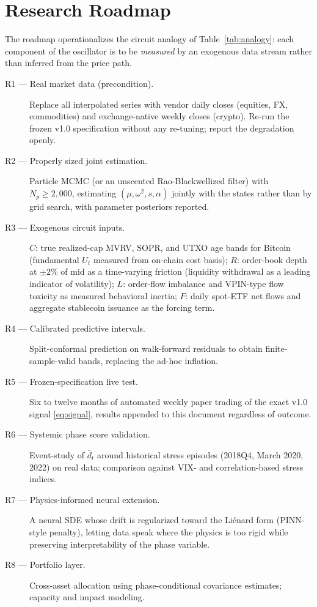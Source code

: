 \documentclass[11pt,a4paper]{article}
\begin{document}
\section{Research Roadmap}\label{sec:roadmap}

The roadmap operationalizes the circuit analogy of Table~\ref{tab:analogy}: each component of the oscillator is to be \emph{measured} by an exogenous data stream rather than inferred from the price path.

\begin{description}
\item[R1 --- Real market data (precondition).] Replace all interpolated series with vendor daily closes (equities, FX, commodities) and exchange-native weekly closes (crypto). Re-run the frozen v1.0 specification without any re-tuning; report the degradation openly.
\item[R2 --- Properly sized joint estimation.] Particle MCMC (or an unscented Rao-Blackwellized filter) with $N_p \ge 2{,}000$, estimating $(\mu, \omega^2, s, \alpha)$ jointly with the states rather than by grid search, with parameter posteriors reported.
\item[R3 --- Exogenous circuit inputs.]
$C$: true realized-cap MVRV, SOPR, and UTXO age bands for Bitcoin (fundamental $U_t$ measured from on-chain cost basis);
$R$: order-book depth at $\pm 2\%$ of mid as a time-varying friction (liquidity withdrawal as a leading indicator of volatility);
$L$: order-flow imbalance and VPIN-type flow toxicity as measured behavioral inertia;
$F$: daily spot-ETF net flows and aggregate stablecoin issuance as the forcing term.
\item[R4 --- Calibrated predictive intervals.] Split-conformal prediction on walk-forward residuals to obtain finite-sample-valid bands, replacing the ad-hoc inflation.
\item[R5 --- Frozen-specification live test.] Six to twelve months of automated weekly paper trading of the exact v1.0 signal \eqref{eq:signal}, results appended to this document regardless of outcome.
\item[R6 --- Systemic phase score validation.] Event-study of $\bar{d}_t$ around historical stress episodes (2018Q4, March 2020, 2022) on real data; comparison against VIX- and correlation-based stress indices.
\item[R7 --- Physics-informed neural extension.] A neural SDE whose drift is regularized toward the Li\'enard form (PINN-style penalty), letting data speak where the physics is too rigid while preserving interpretability of the phase variable.
\item[R8 --- Portfolio layer.] Cross-asset allocation using phase-conditional covariance estimates; capacity and impact modeling.
\end{description}
\end{document}
